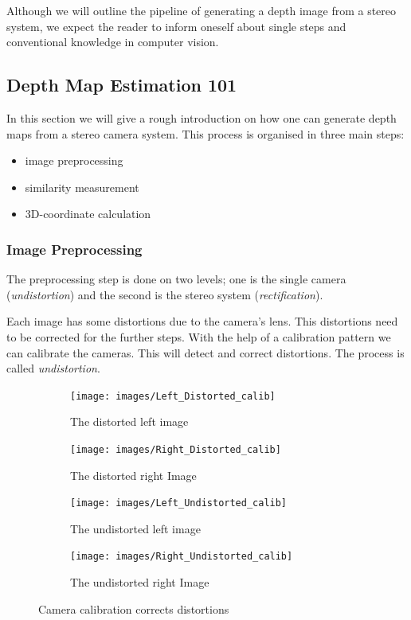 \documentclass[11pt]{article}
\begin{document}
Although we will outline the pipeline of generating a depth image from a stereo system, we expect the reader to inform oneself about single steps and conventional knowledge in computer vision.

\subsection{Depth Map Estimation 101}\label{sec:101}
In this section we will give a rough introduction on how one can generate depth maps from a stereo camera system. This process is organised in three main steps:
\begin{itemize}
	\item image preprocessing
	\item similarity measurement
	\item 3D-coordinate calculation
\end{itemize}
\subsubsection{Image Preprocessing}
The preprocessing step is done on two levels; one is the single camera (\emph{undistortion}) and the second is the stereo system (\emph{rectification}).

Each image has some distortions due to the camera's lens. This distortions need to be corrected for the further steps. With the help of a calibration pattern we can calibrate the cameras. This will detect and correct distortions. The process is called \emph{undistortion}. 

\begin{figure}[H]
        \centering
        \begin{subfigure}[b]{0.45\textwidth}
                \texttt{[image: images/Left\_Distorted\_calib]}
                \caption{The distorted left image}
                \label{fig:ex1_left}
        \end{subfigure}\hfill  
        \begin{subfigure}[b]{0.45\textwidth}
                \texttt{[image: images/Right\_Distorted\_calib]}
                \caption{The distorted right Image}
                \label{fig:ex1_right}
        \end{subfigure}

       \begin{subfigure}[b]{0.45\textwidth}
                \texttt{[image: images/Left\_Undistorted\_calib]}
                \caption{The undistorted left image}
                \label{fig:ex1_left}
        \end{subfigure}\hfill  
        \begin{subfigure}[b]{0.45\textwidth}
                \texttt{[image: images/Right\_Undistorted\_calib]}
                \caption{The undistorted right Image}
                \label{fig:ex1_right}
        \end{subfigure}
        \caption{Camera calibration corrects distortions}\label{fig:undistortion}
\end{figure}
\end{document}
